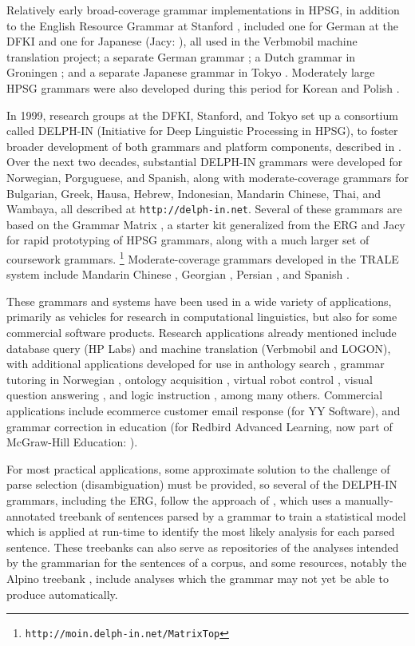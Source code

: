 \documentclass[output=paper]{langsci/langscibook}
\begin{document}
Relatively early broad-coverage grammar implementations in HPSG, in addition to the English Resource Grammar at Stanford \citep{erg}, included one for German at the DFKI \citep{MK2000a} and one for Japanese (Jacy: \citet{Siegel2000a}), all used in the Verbmobil machine translation project; a separate German grammar \citep{Babel}; a Dutch grammar in Groningen \citep{BvNM2001a-u}; and a separate Japanese grammar in Tokyo \citep{MNT2005a-u}.  Moderately large HPSG grammars were also developed during this period for Korean \citep{KY2003a-u} and Polish \citep{myk:etal:02}.  

In 1999, research groups at the DFKI, Stanford, and Tokyo set up a consortium called DELPH-IN (Initiative for Deep Linguistic Processing in HPSG), to foster broader development of both grammars and platform components, described in \citet{OFTU2002a-ed}.  Over the next two decades, substantial DELPH-IN grammars were developed for Norwegian, Porguguese, and Spanish, along with moderate-coverage grammars for Bulgarian, Greek, Hausa, Hebrew, Indonesian, Mandarin Chinese, Thai, and Wambaya, all described at {\tt http://delph-in.net}.  Several of these grammars are based on the Grammar Matrix \citep{BFO2002a-u}, a starter kit generalized from the ERG and Jacy for rapid prototyping of HPSG grammars, along with a much larger set of coursework grammars. \footnote{\tt http://moin.delph-in.net/MatrixTop} Moderate-coverage grammars developed in the TRALE system include Mandarin Chinese \citep{ML2013a}, Georgian \citep{Abzianidze2011a-u}, Persian \citep{MG2010a}, and Spanish \citep{Machicao-y-Priemer2015a}.

These grammars and systems have been used in a wide variety of applications, primarily as vehicles for research in computational linguistics, but also for some commercial software products.  Research applications already mentioned include database query (HP Labs) and machine translation (Verbmobil and LOGON), with additional applications developed for use in anthology search \citep{Sch:Kie:Spu:11}, grammar tutoring in Norwegian \citep{Hellanetal:13}, ontology acquisition \citep{Herb:Cope:06}, virtual robot control \citep{packard2014uw}, visual question answering \citep{DBLP:journals/corr/KuhnleC17}, and logic instruction \citep{Flickinger:17}, among many others.  Commercial applications include ecommerce customer email response (for YY Software), and grammar correction in education (for Redbird Advanced Learning, now part of McGraw-Hill Education: \citet{Suppesetal:12}).

For most practical applications, some approximate solution to the challenge of parse selection (disambiguation) must be provided, so several of the DELPH-IN grammars, including the ERG, follow the approach of \citet{OFTM2004a-u-platte}, which uses a manually-annotated treebank of sentences parsed by a grammar to train a statistical model which is applied at run-time to identify the most likely analysis for each parsed sentence.  These treebanks can also serve as repositories of the analyses intended by the grammarian for the sentences of a corpus, and some resources, notably the Alpino treebank \citep{BvNM2001a-u}, include analyses which the grammar may not yet be able to produce automatically.  
\end{document}
